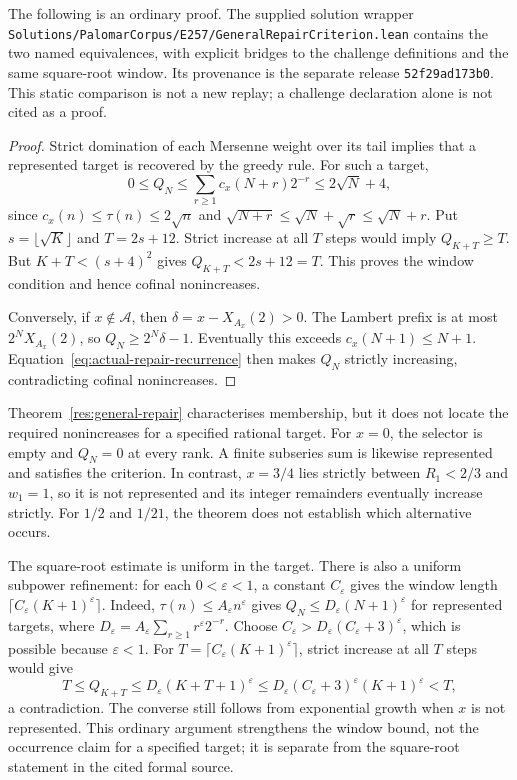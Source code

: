\documentclass[11pt]{article}
\newcommand{\Ach}{\mathcal A}
\begin{document}
The following is an ordinary proof.  The supplied solution wrapper
\nolinkurl{Solutions/PalomarCorpus/E257/GeneralRepairCriterion.lean}
contains the two named equivalences, with explicit bridges to the challenge
definitions and the same square-root window.  Its provenance is the
separate release \texttt{52f29ad173b0}.  This static comparison is not a
new replay; a challenge declaration alone is not cited as a proof.

\begin{proof}
Strict domination of each Mersenne weight over its tail implies that a
represented target is recovered by the greedy rule.  For such a target,
\[
 0\le Q_N\le\sum_{r\ge1}c_x(N+r)2^{-r}
 \le2\sqrt N+4,
\]
since $c_x(n)\le\tau(n)\le2\sqrt n$ and
$\sqrt{N+r}\le\sqrt N+\sqrt r\le\sqrt N+r$.
Put $s=\lfloor\sqrt K\rfloor$ and $T=2s+12$.
Strict increase at all $T$ steps would imply $Q_{K+T}\ge T$.
But $K+T<(s+4)^2$ gives $Q_{K+T}<2s+12=T$.
This proves the window condition and hence cofinal nonincreases.

Conversely, if $x\notin\Ach$, then
$\delta=x-X_{A_x}(2)>0$.  The Lambert prefix is at most
$2^NX_{A_x}(2)$, so $Q_N\ge2^N\delta-1$.
Eventually this exceeds $c_x(N+1)\le N+1$.
Equation~\eqref{eq:actual-repair-recurrence} then makes $Q_N$ strictly
increasing, contradicting cofinal nonincreases.
\end{proof}

Theorem~\ref{res:general-repair} characterises membership, but it does not
locate the required nonincreases for a specified rational target.  For $x=0$, the selector is empty and $Q_N=0$ at every
rank.  A finite subseries sum is likewise represented and satisfies the
criterion.  In contrast, $x=3/4$ lies strictly between $R_1<2/3$ and
$w_1=1$, so it is not represented and its integer remainders eventually
increase strictly.  For $1/2$ and $1/21$, the theorem does not establish
which alternative occurs.

The square-root estimate is uniform in the target.  There is also a
uniform subpower refinement: for each $0<\varepsilon<1$, a constant
$C_\varepsilon$ gives the window length
$\lceil C_\varepsilon(K+1)^\varepsilon\rceil$.
Indeed, $\tau(n)\le A_\varepsilon n^\varepsilon$ gives
$Q_N\le D_\varepsilon(N+1)^\varepsilon$ for represented targets,
where $D_\varepsilon=A_\varepsilon\sum_{r\ge1}r^\varepsilon2^{-r}$.
Choose $C_\varepsilon>D_\varepsilon(C_\varepsilon+3)^\varepsilon$,
which is possible because $\varepsilon<1$.
For $T=\lceil C_\varepsilon(K+1)^\varepsilon\rceil$, strict increase
at all $T$ steps would give
\[
 T\le Q_{K+T}\le D_\varepsilon(K+T+1)^\varepsilon
 \le D_\varepsilon(C_\varepsilon+3)^\varepsilon(K+1)^\varepsilon<T,
\]
a contradiction.  The converse still follows from exponential growth
when $x$ is not represented.  This ordinary argument strengthens the
window bound, not the occurrence claim for a specified target; it is
separate from the square-root statement in the cited formal source.
\end{document}
